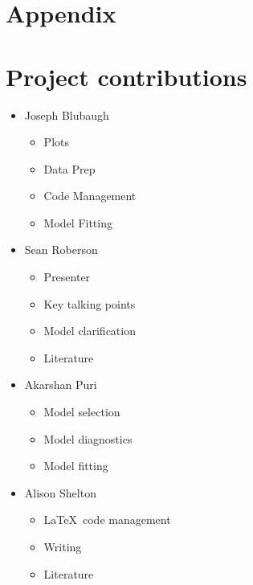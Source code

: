 \documentclass[twoside,twocolumn]{article}
\begin{document}

\begin{flushleft}
\end{flushleft}
 \section*{Appendix}
 \appendix
 \section*{Project contributions}
 \begin{itemize}
 	\item Joseph Blubaugh
 		\begin{itemize}
 			\item Plots
 			\item Data Prep
 			\item Code Management
 			\item Model Fitting
 		\end{itemize}

 	\item Sean Roberson
 	 		\begin{itemize}
 			\item Presenter
 			\item Key talking points
 			\item Model clarification
 			\item Literature
 		\end{itemize}

	\item Akarshan Puri
			\begin{itemize}
 			\item Model selection
 			\item Model diagnostics
 			\item Model fitting
 		\end{itemize}

 	\item Alison Shelton
 			\begin{itemize}
 				\item \LaTeX \ code management
 				\item Writing
 				\item Literature
 			\end{itemize}


\end{itemize}
\end{document}
